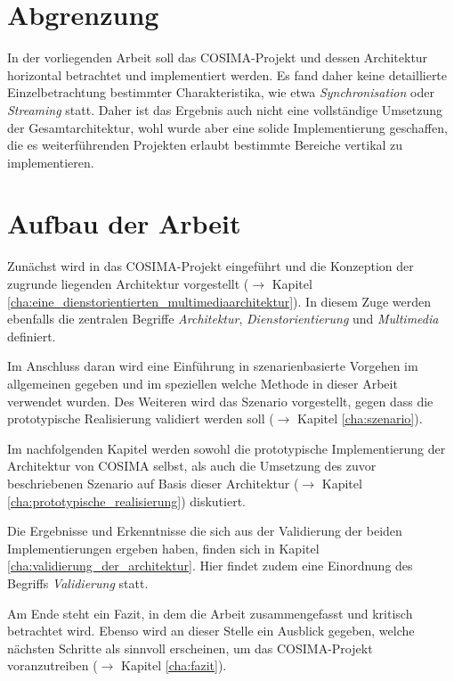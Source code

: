 
\section{Abgrenzung} %
\label{sec:abgrenzung}

  In der vorliegenden Arbeit soll das COSIMA-Projekt und dessen Architektur horizontal betrachtet und implementiert werden. Es fand daher keine detaillierte Einzelbetrachtung bestimmter Charakteristika, wie etwa \emph{Synchronisation} oder \emph{Streaming} statt. Daher ist das Ergebnis auch nicht eine vollständige Umsetzung der Gesamtarchitektur, wohl wurde aber eine solide Implementierung geschaffen, die es weiterführenden Projekten erlaubt bestimmte Bereiche vertikal zu implementieren.


\section{Aufbau der Arbeit} %
\label{sec:aufbau_der_arbeit}

  Zunächst wird in das COSIMA-Projekt eingeführt und die Konzeption der zugrunde liegenden Architektur vorgestellt ($\to$ Kapitel \ref{cha:eine_dienstorientierten_multimediaarchitektur}). In diesem Zuge werden ebenfalls die zentralen Begriffe \emph{Architektur}, \emph{Dienstorientierung} und \emph{Multimedia} definiert.
  
  Im Anschluss daran wird eine Einführung in szenarienbasierte Vorgehen im allgemeinen gegeben und im speziellen welche Methode in dieser Arbeit verwendet wurden. Des Weiteren wird das Szenario vorgestellt, gegen dass die prototypische Realisierung validiert werden soll ($\to$ Kapitel \ref{cha:szenario}).
  
  Im nachfolgenden Kapitel werden sowohl die prototypische Implementierung der Architektur von COSIMA selbst, als auch die Umsetzung des zuvor beschriebenen Szenario auf Basis dieser Architektur ($\to$ Kapitel \ref{cha:prototypische_realisierung}) diskutiert.
  
  Die Ergebnisse und Erkenntnisse die sich aus der Validierung der beiden Implementierungen ergeben haben, finden sich in Kapitel \ref{cha:validierung_der_architektur}. Hier findet zudem eine Einordnung des Begriffs \emph{Validierung} statt.
  
  Am Ende steht ein Fazit, in dem die Arbeit zusammengefasst und kritisch betrachtet wird. Ebenso wird an dieser Stelle ein Ausblick gegeben, welche nächsten Schritte als sinnvoll erscheinen, um das COSIMA-Projekt voranzutreiben ($\to$ Kapitel \ref{cha:fazit}).
  

